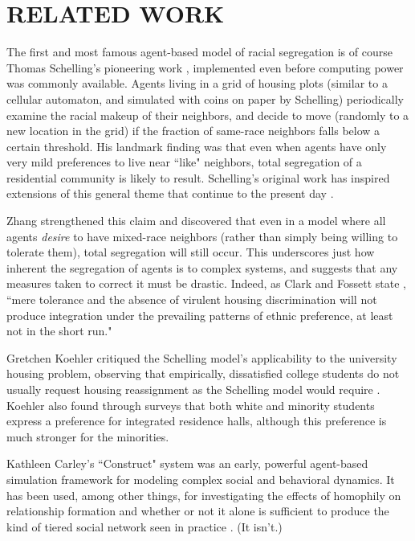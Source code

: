 
\section{RELATED WORK}
\label{sec:related}

The first and most famous agent-based model of racial segregation is of course
Thomas Schelling's pioneering work \cite{schelling_models_1969}, implemented
even before computing power was commonly available. Agents living in a grid of
housing plots (similar to a cellular automaton, and simulated with coins on
paper by Schelling) periodically examine the racial makeup of their neighbors,
and decide to move (randomly to a new location in the grid) if the fraction of
same-race neighbors falls below a certain threshold. His landmark finding was
that even when agents have only very mild preferences to live near ``like"
neighbors, total segregation of a residential community is likely to result.
Schelling's original work has inspired extensions of this general theme that
continue to the present day \cite[to name just a
few]{laurie_role_2003,chen_emergence_2005,collard_emergence_2013,pate_segregation_2010,yin_dynamics_2009,fossett_overlooked_2005,abbas_agent-based_2013}.

Zhang \citeyear{zhang_evolutionary_2002} strengthened this claim and
discovered that even in a model where all agents \textit{desire} to have
mixed-race neighbors (rather than simply being willing to tolerate them),
total segregation will still occur. This underscores just how inherent the
segregation of agents is to complex systems, and suggests that any measures
taken to correct it must be drastic. Indeed, as Clark and Fossett state
\citeyear{clark_understanding_2008}, ``mere tolerance and the absence of
virulent housing discrimination will not produce integration under the
prevailing patterns of ethnic preference, at least not in the short run."

Gretchen Koehler \citeyear{koehler_racial_2001} critiqued the Schelling
model's applicability to the university housing problem, observing that
empirically, dissatisfied college students do not usually request housing
reassignment as the Schelling model would require
\cite{koehler_residential_2010}. Koehler also found through surveys that both
white and minority students express a preference for integrated residence
halls, although this preference is much stronger for the minorities.

Kathleen Carley's ``Construct" system
\cite{carley_theory_1991,schreiber_construct-multi-agent_2004} was an early,
powerful agent-based simulation framework for modeling complex social and
behavioral dynamics. It has been used, among other things, for investigating
the effects of homophily on relationship formation and whether or not it alone
is sufficient to produce the kind of tiered social network seen in practice
\cite{hirshman_leaving_2011}. (It isn't.)

